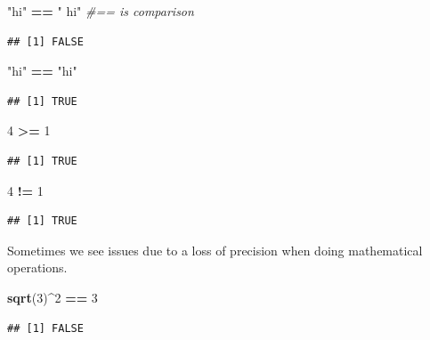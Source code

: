 \documentclass[
]{book}
\newenvironment{Shaded}{\begin{snugshade}}{\end{snugshade}}
\newcommand{\CommentTok}[1]{\textcolor[rgb]{0.56,0.35,0.01}{\textit{#1}}}
\newcommand{\DecValTok}[1]{\textcolor[rgb]{0.00,0.00,0.81}{#1}}
\newcommand{\KeywordTok}[1]{\textcolor[rgb]{0.13,0.29,0.53}{\textbf{#1}}}
\newcommand{\NormalTok}[1]{#1}
\newcommand{\OperatorTok}[1]{\textcolor[rgb]{0.81,0.36,0.00}{\textbf{#1}}}
\newcommand{\StringTok}[1]{\textcolor[rgb]{0.31,0.60,0.02}{#1}}
\theoremstyle{definition}
\theoremstyle{definition}
\theoremstyle{definition}
\theoremstyle{remark}
\begin{document}
\begin{Shaded}
\begin{Highlighting}[]
\StringTok{"hi"} \OperatorTok{==}\StringTok{ " hi"} \CommentTok{#== is comparison}
\end{Highlighting}
\end{Shaded}

\begin{verbatim}
## [1] FALSE
\end{verbatim}

\begin{Shaded}
\begin{Highlighting}[]
\StringTok{"hi"} \OperatorTok{==}\StringTok{ "hi"}
\end{Highlighting}
\end{Shaded}

\begin{verbatim}
## [1] TRUE
\end{verbatim}

\begin{Shaded}
\begin{Highlighting}[]
\DecValTok{4} \OperatorTok{>=}\StringTok{ }\DecValTok{1}
\end{Highlighting}
\end{Shaded}

\begin{verbatim}
## [1] TRUE
\end{verbatim}

\begin{Shaded}
\begin{Highlighting}[]
\DecValTok{4} \OperatorTok{!=}\StringTok{ }\DecValTok{1}
\end{Highlighting}
\end{Shaded}

\begin{verbatim}
## [1] TRUE
\end{verbatim}

Sometimes we see issues due to a loss of precision when doing mathematical operations.

\begin{Shaded}
\begin{Highlighting}[]
\KeywordTok{sqrt}\NormalTok{(}\DecValTok{3}\NormalTok{)}\OperatorTok{^}\DecValTok{2}  \OperatorTok{==}\StringTok{ }\DecValTok{3}
\end{Highlighting}
\end{Shaded}

\begin{verbatim}
## [1] FALSE
\end{verbatim}
\end{document}
